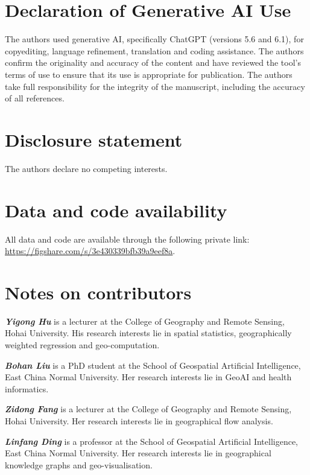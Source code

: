 \documentclass[]{interact}
\newif\ifanonymous
\begin{document}
\section*{Declaration of Generative AI Use}

The authors used generative AI, specifically ChatGPT (versions 5.6 and 6.1), for copyediting, language refinement, translation and coding assistance.
The authors confirm the originality and accuracy of the content and have reviewed the tool's terms of use to ensure that its use is appropriate for publication.
The authors take full responsibility for the integrity of the manuscript, including the accuracy of all references.

\section*{Disclosure statement}

The authors declare no competing interests.

\section*{Data and code availability}

All data and code are available through the following private link: \\
\url{https://figshare.com/s/3e430339bfb39a9eef8a}.

\ifanonymous
\else
\section*{Notes on contributors}

\emph{\textbf{Yigong Hu}} is a lecturer at the College of Geography and Remote Sensing, Hohai University. His research interests lie in spatial statistics, geographically weighted regression and geo-computation.

\emph{\textbf{Bohan Liu}} is a PhD student at the School of Geospatial Artificial Intelligence, East China Normal University. Her research interests lie in GeoAI and health informatics.

\emph{\textbf{Zidong Fang}} is a lecturer at the College of Geography and Remote Sensing, Hohai University. Her research interests lie in geographical flow analysis.

\emph{\textbf{Linfang Ding}} is a professor at the School of Geospatial Artificial Intelligence, East China Normal University. Her research interests lie in geographical knowledge graphs and geo-visualisation.
\end{document}
